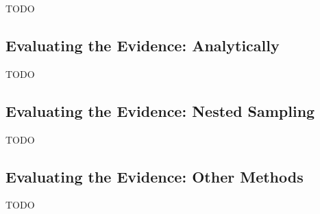 \documentclass[11pt]{article}
\begin{document}
\noindent TODO

\subsection{Evaluating the Evidence: Analytically}

TODO

\subsection{Evaluating the Evidence: Nested Sampling}

TODO

\subsection{Evaluating the Evidence: Other Methods}

TODO
\end{document}
